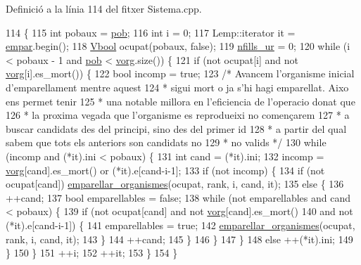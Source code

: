 Definició a la línia 114 del fitxer Sistema.\-cpp.


\begin{DoxyCode}
114                                                     \{
115   \textcolor{keywordtype}{int} pobaux = \hyperlink{class_sistema_a5fe670604926861f960dfb33c80d45cf}{pob};
116   \textcolor{keywordtype}{int} i = 0;
117   Lemp::iterator it = \hyperlink{class_sistema_a98845ff9b4955ce24f2378d90ca135aa}{empar}.begin();
118   \hyperlink{class_sistema_aed93022dab0bed25a0b6439559ea1b8b}{Vbool} ocupat(pobaux, \textcolor{keyword}{false});
119   \hyperlink{class_sistema_aebdda1654fd616f76f03691926ecfb09}{nfills\_ur} = 0;
120   \textcolor{keywordflow}{while} (i < pobaux - 1 and \hyperlink{class_sistema_a5fe670604926861f960dfb33c80d45cf}{pob} < \hyperlink{class_sistema_aaf10c33a8449e355103fb2d849bb3d58}{vorg}.size()) \{
121     \textcolor{keywordflow}{if} (not ocupat[i] and not \hyperlink{class_sistema_aaf10c33a8449e355103fb2d849bb3d58}{vorg}[i].es\_mort()) \{
122       \textcolor{keywordtype}{bool} incomp = \textcolor{keyword}{true};
123       \textcolor{comment}{/* Avancem l'organisme inicial d'emparellament mentre aquest
}
124 \textcolor{comment}{       * sigui mort o ja s'hi hagi emparellat. Aixo ens permet tenir
}
125 \textcolor{comment}{       * una notable millora en l'eficiencia de l'operacio donat que
}
126 \textcolor{comment}{       * la proxima vegada que l'organisme es reprodueixi no començarem
}
127 \textcolor{comment}{       * a buscar candidats des del principi, sino des del primer id
}
128 \textcolor{comment}{       * a partir del qual sabem que tots els anteriors son candidats no
}
129 \textcolor{comment}{       * no valids */}
130       \textcolor{keywordflow}{while} (incomp and (*it).ini < pobaux) \{
131         \textcolor{keywordtype}{int} cand = (*it).ini;
132         incomp = \hyperlink{class_sistema_aaf10c33a8449e355103fb2d849bb3d58}{vorg}[cand].es\_mort() or (*it).e[cand-i-1];
133         if (not incomp) \{
134           \textcolor{keywordflow}{if} (not ocupat[cand]) \hyperlink{class_sistema_a13f288276b20ffc386edd42964b60277}{emparellar\_organismes}(ocupat, rank, i, cand, it);
135           \textcolor{keywordflow}{else} \{
136             ++cand;
137             \textcolor{keywordtype}{bool} emparellables = \textcolor{keyword}{false};
138             \textcolor{keywordflow}{while} (not emparellables and cand < pobaux) \{
139               \textcolor{keywordflow}{if} (not ocupat[cand] and not \hyperlink{class_sistema_aaf10c33a8449e355103fb2d849bb3d58}{vorg}[cand].es\_mort()
140                                    and not (*it).e[cand-i-1]) \{
141                 emparellables = \textcolor{keyword}{true};
142                 \hyperlink{class_sistema_a13f288276b20ffc386edd42964b60277}{emparellar\_organismes}(ocupat, rank, i, cand, it);
143               \}
144               ++cand;
145             \}
146           \}
147         \}
148         \textcolor{keywordflow}{else} ++(*it).ini;
149       \}
150     \}
151     ++i;
152     ++it;
153   \}
154 \}
\end{DoxyCode}
